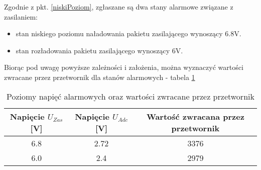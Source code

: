 Zgodnie z pkt. \ref{niskiPoziom}, zgłaszane są dwa stany alarmowe związane z zasilaniem:
\begin{itemize}
\item
    stan niskiego poziomu naładowania pakietu zasilającego wynoszący 6.8V.
\item
    stan rozładowania pakietu zasilającego wynoszący 6V.
\end{itemize}

Biorąc pod uwagę powyższe zależności i założenia, można wyznaczyć wartości zwracane przez przetwornik dla stanów alarmowych - tabela \ref{tab:napieciaDwojnik}

\begin{table}[h]
    \caption{Poziomy napięć alarmowych oraz wartości zwracane przez przetwornik}
    \begin{center}
		\label{tab:napieciaDwojnik}
		\begin{tabular}{|c|c|c|}
			\hline
 			\textbf{Napięcie $U_{Zas}$ [V]}& \textbf{Napięcie $U_{Adc}$ [V]}& \textbf{Wartość zwracana przez przetwornik} \\
 			\hline
 			6.8 & 2.72 & 3376 \\  
 			\hline
			6.0 & 2.4 & 2979 \\
			\hline
		\end{tabular}
	\end{center}
\end{table}




